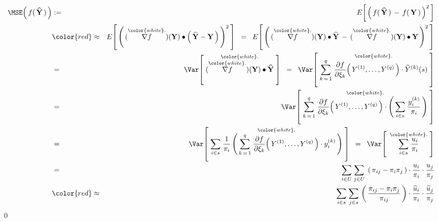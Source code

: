 \begin{eqnarray*}
\MSE\!\left(\,
    f(\,\widehat{\mathbf{Y}}\,)
    \,\right)
& := &
    E\!\left[\,\left(\,
        f(\,\widehat{\mathbf{Y}}\,)
        \, - \,
        f(\,\mathbf{Y}\,)
        \,\right)^{2}\,\right]
\\
& {\color{red}\approx} &
    E\!\left[\,\left(\,
        (\overset{{\color{white}.}}{\nabla f})(\mathbf{Y})
        \bullet
        \left(\,\widehat{\mathbf{Y}} - \mathbf{Y}\,\right)
        \,\right)^{2}\,\right]
\;\; = \;\;
    E\!\left[\,\left(\,
        (\overset{{\color{white}.}}{\nabla f})(\mathbf{Y})
        \bullet
        \widehat{\mathbf{Y}}
        \, - \,
        (\overset{{\color{white}.}}{\nabla f})(\mathbf{Y})
        \bullet
            \mathbf{Y}
        \,\right)^{2}\,\right]
\\
& = &
    \Var\!\left[\;
        \overset{{\color{white}.}}{
            (\overset{{\color{white}.}}{\nabla f})(\mathbf{Y})
            \bullet
            \widehat{\mathbf{Y}}
            }
        \;\right]
\;\; = \;\;
    \Var\!\left[\;
        \overset{{\color{white}.}}{
            \overset{q}{\underset{k\,=\,1}{\sum}}\;
            \dfrac{\partial f}{\partial \xi_{k}}\!\left(\,
                Y^{(1)},\ldots,Y^{(q)}
                \,\right)
            \cdot
            \widehat{Y}^{(k)}(s)
            }
        \;\right]
\\
& = &
    \Var\!\left[\;
        \overset{{\color{white}.}}{
            \overset{q}{\underset{k\,=\,1}{\sum}}\;
            \dfrac{\partial f}{\partial \xi_{k}}\!\left(\,
                Y^{(1)},\ldots,Y^{(q)}
                \,\right)
            \cdot
            \left(\,\underset{i \in s}{\sum}\;\dfrac{y^{(k)}_{i}}{\pi_{i}}\,\right)
            }
        \;\right]
\\
& = &
    \Var\!\left[\;
        \overset{{\color{white}.}}{
            \underset{i \in s}{\sum}\;
            \dfrac{1}{\pi_{i}}
            \left(\,
                \overset{q}{\underset{k\,=\,1}{\sum}}\;
                \dfrac{\partial f}{\partial \xi_{k}}\!\left(\,
                    Y^{(1)},\ldots,Y^{(q)}
                    \,\right)
                \cdot
                y^{(k)}_{i}
                \,\right)
            }
        \;\right]
\;\; = \;\;
    \Var\!\left[\;\,
        \overset{{\color{white}.}}{
            \underset{i \in s}{\sum}\;\dfrac{u_{i}}{\pi_{i}}
            }
        \;\right]
\\
& = &
    \underset{i \in U}{\sum}\;
    \underset{j \in U}{\sum}\;
    \left(\,\pi_{ij} - \pi_{i}\pi_{j}\,\right)
    \cdot
    \dfrac{u_{i}}{\pi_{i}}
    \cdot
    \dfrac{u_{j}}{\pi_{j}}
\\
& {\color{red}\approx} &
    \underset{i \in s}{\sum}\;
    \underset{j \in s}{\sum}\,
    \left(\,
        \dfrac{
            \pi_{ij} - \pi_{i}\pi_{j}
            }{
            \pi_{ij}
            }
        \,\right)
    \cdot
    \dfrac{\widehat{u}_{i}}{\pi_{i}}
    \cdot
    \dfrac{\widehat{u}_{j}}{\pi_{j}}
\end{eqnarray*}
\vskip -0.5cm
\qed

